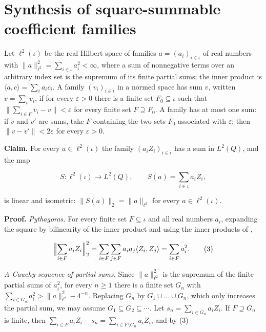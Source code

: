 \documentclass[11pt,a4paper]{article}
\begin{document}
\section{\texorpdfstring{Synthesis of square-summable coefficient families}{Synthesis of square-summable coefficient families}}


Let \(\ell^2(\iota)\) be the real Hilbert space of families \(a=(a_i)_{i\in\iota}\) of real numbers with \(\|a\|_{\ell^2}^2=\sum_{i\in\iota}a_i^2<\infty\), where a sum of nonnegative terms over an arbitrary index set is the supremum of its finite partial sums; the inner product is \(\langle a,c\rangle=\sum_ia_ic_i\). A family \((v_i)_{i\in\iota}\) in a normed space has sum \(v\), written \(v=\sum_iv_i\), if for every \(\varepsilon>0\) there is a finite set \(F_0\subseteq\iota\) such that \(\bigl\|\sum_{i\in F}v_i-v\bigr\|<\varepsilon\) for every finite set \(F\supseteq F_0\). A family has at most one sum: if \(v\) and \(v'\) are sums, take \(F\) containing the two sets \(F_0\) associated with \(\varepsilon\); then \(\|v-v'\|<2\varepsilon\) for every \(\varepsilon>0\).




\textbf{Claim.} For every \(a\in\ell^2(\iota)\) the family \((a_iZ_i)_{i\in\iota}\) has a sum in \(L^2(Q)\), and the map


\[S:\ell^2(\iota)\to L^2(Q),\qquad S(a)=\sum_{i\in\iota}a_iZ_i,\]


is linear and isometric: \(\|S(a)\|_2=\|a\|_{\ell^2}\) for every \(a\in\ell^2(\iota)\).




\textbf{Proof.} \emph{Pythagoras.} For every finite set \(F\subseteq\iota\) and all real numbers \(a_i\), expanding the square by bilinearity of the inner product and using the inner products of \cite[Section~3.6.8]{LangevinLean2026ULASC},


\[\Bigl\|\sum_{i\in F}a_iZ_i\Bigr\|_2^2=\sum_{i\in F}\sum_{j\in F}a_ia_j\langle Z_i,Z_j\rangle=\sum_{i\in F}a_i^2.\qquad(3)\]


\emph{A Cauchy sequence of partial sums.} Since \(\|a\|_{\ell^2}^2\) is the supremum of the finite partial sums of \(a_i^2\), for every \(n\ge1\) there is a finite set \(G_n\) with \(\sum_{i\in G_n}a_i^2>\|a\|_{\ell^2}^2-4^{-n}\). Replacing \(G_n\) by \(G_1\cup\dots\cup G_n\), which only increases the partial sum, we may assume \(G_1\subseteq G_2\subseteq\cdots\). Let \(s_n=\sum_{i\in G_n}a_iZ_i\). If \(F\supseteq G_n\) is finite, then \(\sum_{i\in F}a_iZ_i-s_n=\sum_{i\in F\setminus G_n}a_iZ_i\), and by (3)
\end{document}
